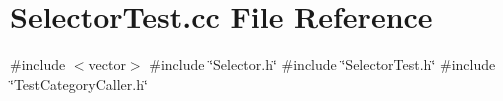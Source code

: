 \section{Selector\+Test.\+cc File Reference}
\label{SelectorTest_8cc}
{\ttfamily \#include $<$vector$>$}\newline
{\ttfamily \#include \char`\"{}Selector.\+h\char`\"{}}\newline
{\ttfamily \#include \char`\"{}Selector\+Test.\+h\char`\"{}}\newline
{\ttfamily \#include \char`\"{}Test\+Category\+Caller.\+h\char`\"{}}\newline
